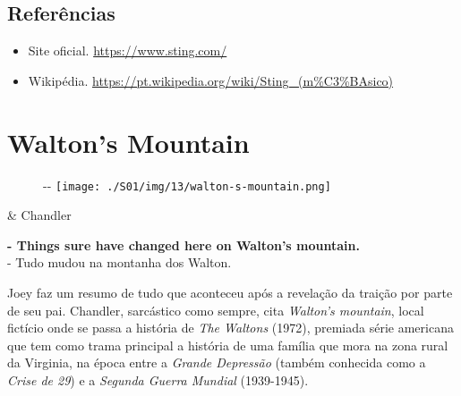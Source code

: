 \hypertarget{referuxeancias-3}{%
\subsection{Referências}\label{referuxeancias-3}}

\begin{itemize}
\tightlist
\item
  \sloppy Site oficial. \url{https://www.sting.com/}
\item
  \sloppy Wikipédia. \url{https://pt.wikipedia.org/wiki/Sting_(m%C3%BAsico)}
\end{itemize}

\hypertarget{waltons-mountain}{%
\section{Walton's Mountain}\label{waltons-mountain}}

\begin{figure}[!ht]
  \begin{adjustwidth}{-\oddsidemargin-1in}{-\rightmargin}
    \centering
    \texttt{[image: ./S01/img/13/walton-s-mountain.png]}
  \end{adjustwidth}
\end{figure}

\begin{tcolorbox}[enhanced,center upper,
    drop fuzzy shadow southeast, boxrule=0.3pt,
    lower separated=false,
    colframe=black!30!dialogoBorder,colback=white]
\begin{minipage}[c]{0.16\linewidth}
   & \centering \scriptsize{Chandler}
\end{minipage}
\hfill
\begin{minipage}[c]{0.8\linewidth}
  \textbf{- Things sure have changed here on Walton's mountain.}\\
  - Tudo mudou na montanha dos Walton.
\end{minipage}
\end{tcolorbox}

Joey faz um resumo de tudo que aconteceu após a revelação da traição por
parte de seu pai. Chandler, sarcástico como sempre, cita \emph{Walton's
mountain}, local fictício onde se passa a história de \emph{The Waltons}
(1972), premiada série americana que tem como trama principal a história
de uma família que mora na zona rural da Virginia, na época entre a
\emph{Grande Depressão} (também conhecida como a \emph{Crise de 29}) e a
\emph{Segunda Guerra Mundial} (1939-1945).

